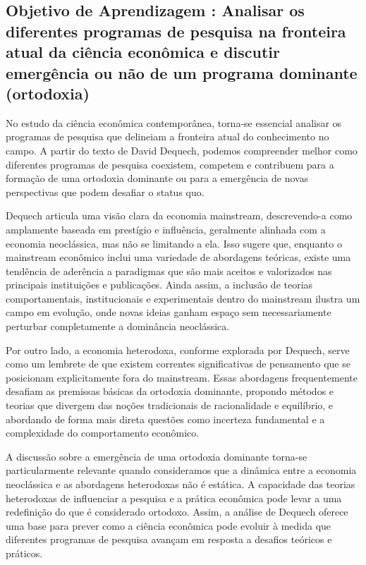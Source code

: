 \documentclass[a4paper,12pt]{article}[abntex2]
\begin{document}
\subsection{\textbf{Objetivo de Aprendizagem : Analisar os diferentes programas de pesquisa na fronteira atual da ciência econômica e discutir emergência ou não de um programa dominante (ortodoxia)}}
No estudo da ciência econômica contemporânea, torna-se essencial analisar os programas de pesquisa que delineiam a fronteira atual do conhecimento no campo. A partir do texto de David Dequech, podemos compreender melhor como diferentes programas de pesquisa coexistem, competem e contribuem para a formação de uma ortodoxia dominante ou para a emergência de novas perspectivas que podem desafiar o status quo. 

Dequech articula uma visão clara da economia mainstream, descrevendo-a como amplamente baseada em prestígio e influência, geralmente alinhada com a economia neoclássica, mas não se limitando a ela. Isso sugere que, enquanto o mainstream econômico inclui uma variedade de abordagens teóricas, existe uma tendência de aderência a paradigmas que são mais aceitos e valorizados nas principais instituições e publicações. Ainda assim, a inclusão de teorias comportamentais, institucionais e experimentais dentro do mainstream ilustra um campo em evolução, onde novas ideias ganham espaço sem necessariamente perturbar completamente a dominância neoclássica.

Por outro lado, a economia heterodoxa, conforme explorada por Dequech, serve como um lembrete de que existem correntes significativas de pensamento que se posicionam explicitamente fora do mainstream. Essas abordagens frequentemente desafiam as premissas básicas da ortodoxia dominante, propondo métodos e teorias que divergem das noções tradicionais de racionalidade e equilíbrio, e abordando de forma mais direta questões como incerteza fundamental e a complexidade do comportamento econômico.

A discussão sobre a emergência de uma ortodoxia dominante torna-se particularmente relevante quando consideramos que a dinâmica entre a economia neoclássica e as abordagens heterodoxas não é estática. A capacidade das teorias heterodoxas de influenciar a pesquisa e a prática econômica pode levar a uma redefinição do que é considerado ortodoxo. Assim, a análise de Dequech oferece uma base para prever como a ciência econômica pode evoluir à medida que diferentes programas de pesquisa avançam em resposta a desafios teóricos e práticos.
\end{document}
